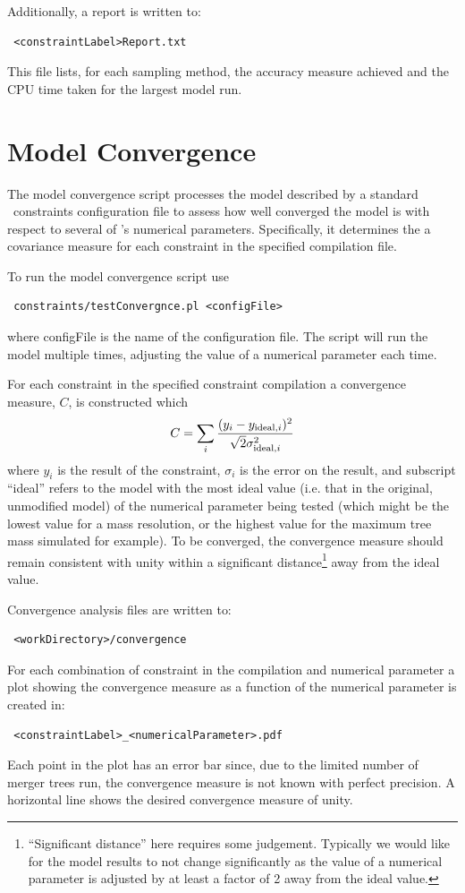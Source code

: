 Additionally, a report is written to:
\begin{verbatim}
 <constraintLabel>Report.txt
\end{verbatim}
This file lists, for each sampling method, the accuracy measure achieved and the CPU time taken for the largest model run.

\section{Model Convergence}\label{sec:ModelConvergence}

The model convergence script processes the model described by a standard \glc\ constraints configuration file to assess how well converged the model is with respect to several of \glc's numerical parameters. Specifically, it determines the a covariance measure for each constraint in the specified compilation file.

To run the model convergence script use
\begin{verbatim}
 constraints/testConvergnce.pl <configFile>
\end{verbatim}
where {\normalfont \ttfamily configFile} is the name of the configuration file. The script will run the model multiple times, adjusting the value of a numerical parameter each time.

For each constraint in the specified constraint compilation a convergence measure, $C$, is constructed which
\begin{equation}
 C = \sum_i {(y_i - y_{\mathrm{ideal}, i})^2 \over \sqrt{2} \sigma_{\mathrm{ideal}, i}^2}
\end{equation}
where $y_i$ is the result of the constraint, $\sigma_i$ is the error on the result, and subscript ``ideal'' refers to the model with the most ideal value (i.e. that in the original, unmodified model) of the numerical parameter being tested (which might be the lowest value for a mass resolution, or the highest value for the maximum tree mass simulated for example). To be converged, the convergence measure should remain consistent with unity within a significant distance\footnote{``Significant distance'' here requires some judgement. Typically we would like for the model results to not change significantly as the value of a numerical parameter is adjusted by at least a factor of 2 away from the ideal value.} away from the ideal value.

Convergence analysis files are written to:
\begin{verbatim}
 <workDirectory>/convergence
\end{verbatim}
For each combination of constraint in the compilation and numerical parameter a plot showing the convergence measure as a function of the numerical parameter is created in:
\begin{verbatim}
 <constraintLabel>_<numericalParameter>.pdf
\end{verbatim}
Each point in the plot has an error bar since, due to the limited number of merger trees run, the convergence measure is not known with perfect precision. A horizontal line shows the desired convergence measure of unity.

